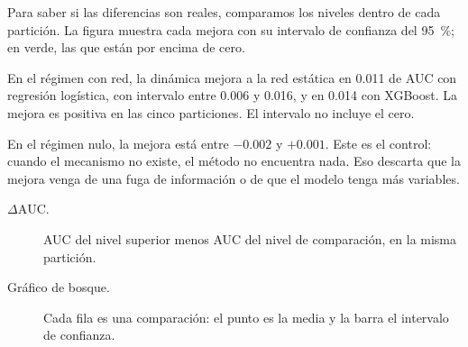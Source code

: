 \begin{decir}
Para saber si las diferencias son reales, comparamos los niveles dentro de cada
partición. La figura muestra cada mejora con su intervalo de confianza del 95~\%; en
verde, las que están por encima de cero.

En el régimen con red, la dinámica mejora a la red estática en 0.011 de AUC con
regresión logística, con intervalo entre 0.006 y 0.016, y en 0.014 con XGBoost. La
mejora es positiva en las cinco particiones. El intervalo no incluye el cero.

En el régimen nulo, la mejora está entre $-0.002$ y $+0.001$. Este es el control: cuando
el mecanismo no existe, el método no encuentra nada. Eso descarta que la mejora venga de
una fuga de información o de que el modelo tenga más variables.
\end{decir}
\begin{terminos}
\begin{description}
\item[$\Delta\mathrm{AUC}$.] AUC del nivel superior menos AUC del nivel de comparación,
en la misma partición.
\item[Gráfico de bosque.] Cada fila es una comparación: el punto es la media y la barra
el intervalo de confianza.
\end{description}
\end{terminos}
\begin{preguntas}
\end{preguntas}

